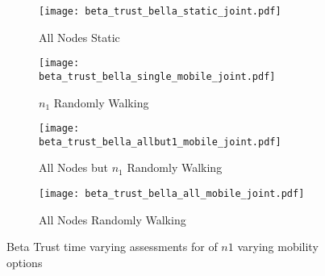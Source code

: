 \begin{figure}
\begin{subfigure}{0.5\textwidth}
  \centering
  \texttt{[image: beta\_trust\_bella\_static\_joint.pdf]}
  \caption{All Nodes Static}
  \label{fig:beta_trust_static}
\end{subfigure}%
\begin{subfigure}{0.5\textwidth}
  \centering
  \texttt{[image: beta\_trust\_bella\_single\_mobile\_joint.pdf]}
  \caption{$n_1$ Randomly Walking}
  \label{fig:beta_trust_single}
\end{subfigure}%

\begin{subfigure}{0.5\textwidth}
\centering
  \texttt{[image: beta\_trust\_bella\_allbut1\_mobile\_joint.pdf]}
  \caption{All Nodes but $n_1$ Randomly Walking}
  \label{fig:beta_trust_allbut1}
\end{subfigure}%
\begin{subfigure}{0.5\textwidth}
\centering
  \texttt{[image: beta\_trust\_bella\_all\_mobile\_joint.pdf]}
  \caption{All Nodes Randomly Walking}
  \label{fig:beta_trust_all_mobile}
\end{subfigure}
\caption{Beta Trust time varying assessments for of $n1$ varying mobility options}
\label{fig:trust_mobility}
\end{figure}



